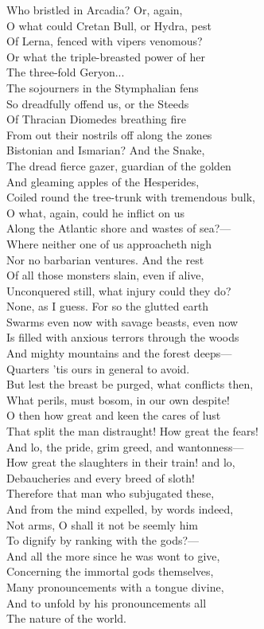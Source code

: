 Who bristled in Arcadia? Or, again,\\
O what could Cretan Bull, or Hydra, pest\\
Of Lerna, fenced with vipers venomous?\\
Or what the triple-breasted power of her\\
The three-fold Geryon...\\
The sojourners in the Stymphalian fens\\
So dreadfully offend us, or the Steeds\\
Of Thracian Diomedes breathing fire\\
From out their nostrils off along the zones\\
Bistonian and Ismarian? And the Snake,\\
The dread fierce gazer, guardian of the golden\\
And gleaming apples of the Hesperides,\\
Coiled round the tree-trunk with tremendous bulk,\\
O what, again, could he inflict on us\\
Along the Atlantic shore and wastes of sea?—\\
Where neither one of us approacheth nigh\\
Nor no barbarian ventures. And the rest\\
Of all those monsters slain, even if alive,\\
Unconquered still, what injury could they do?\\
None, as I guess. For so the glutted earth\\
Swarms even now with savage beasts, even now\\
Is filled with anxious terrors through the woods\\
And mighty mountains and the forest deeps—\\
Quarters 'tis ours in general to avoid.\\
But lest the breast be purged, what conflicts then,\\
What perils, must bosom, in our own despite!\\
O then how great and keen the cares of lust\\
That split the man distraught! How great the fears!\\
And lo, the pride, grim greed, and wantonness—\\
How great the slaughters in their train! and lo,\\
Debaucheries and every breed of sloth!\\
Therefore that man who subjugated these,\\
And from the mind expelled, by words indeed,\\
Not arms, O shall it not be seemly him\\
To dignify by ranking with the gods?—\\
And all the more since he was wont to give,\\
Concerning the immortal gods themselves,\\
Many pronouncements with a tongue divine,\\
And to unfold by his pronouncements all\\
The nature of the world.

